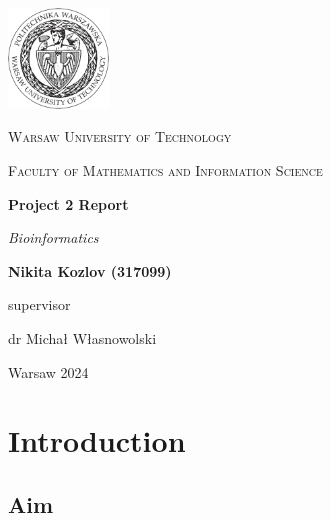 \documentclass[11pt, a4paper, hidelinks]{article}
\begin{document}
\begin{titlepage}
    \centering
    \vspace*{0.5 cm}
    \includegraphics[width=0.20\textwidth]{logo.png}\par\vspace{1cm}
    {\scshape\LARGE Warsaw University of Technology \par}
    \vspace{1cm}
    {\scshape\Large Faculty of Mathematics and Information Science\par}
    \vspace{1.5cm}
    {\huge\bfseries Project 2 Report\par}
    \vspace{1cm}
    {\Large\itshape Bioinformatics\par}
    \vfill
    \begin{flushright}

    {\Large\bfseries Nikita Kozlov (317099)\par}
    \vfill
    {supervisor\par}
    {\Large dr Michał Własnowolski \par}

    \end{flushright}
    \vfill
    {\large Warsaw 2024\par}
    \vspace{1cm}
\end{titlepage}

\tableofcontents

\newpage

\section{Introduction}\label{sec:introduction}


\subsection{Aim}\label{subsec:aim}
\end{document}

